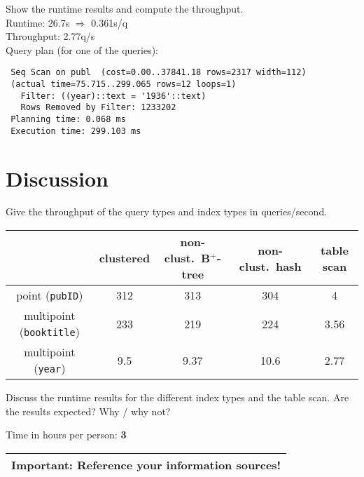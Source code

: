 \documentclass[11pt]{scrartcl}
\begin{document}
\noindent
\condC

\smallskip\noindent
Show the runtime results and compute the throughput.\\
Runtime: 26.7s $\Rightarrow$ 0.361s/q\\
Throughput: 2.77q/s\\


\smallskip\noindent
Query plan (for one of the queries):
{\small
\begin{verbatim}
 Seq Scan on publ  (cost=0.00..37841.18 rows=2317 width=112)
 (actual time=75.715..299.065 rows=12 loops=1)
   Filter: ((year)::text = '1936'::text)
   Rows Removed by Filter: 1233202
 Planning time: 0.068 ms
 Execution time: 299.103 ms
\end{verbatim}
}

\section{Discussion}

Give the throughput of the query types and index types in queries/second.
\begin{center}
  \begin{tabular}{c|c|c|c|c}
    & clustered & non-clust.\ B$^+$-tree & non-clust.\ hash & table scan \\
    \hline
    point ({\tt pubID}) & 312 & 313 & 304 & 4\\
    \hline
    multipoint ({\tt booktitle}) & 233 & 219 & 224 & 3.56 \\
    \hline
    multipoint  ({\tt year}) & 9.5 & 9.37 & 10.6 & 2.77 \\  
  \end{tabular}
\end{center}

\medskip

Discuss the runtime results for the different index types and the
table scan. Are the results expected? Why / why not?\\


\bigskip

\noindent Time in hours per person: {\bf 3}

\bigskip

\begin{center}
  \begin{tabular}{c}
    \hline
    {\bf Important:} Reference your information sources!
    \\\hline
  \end{tabular}
\end{center}
\end{document}
